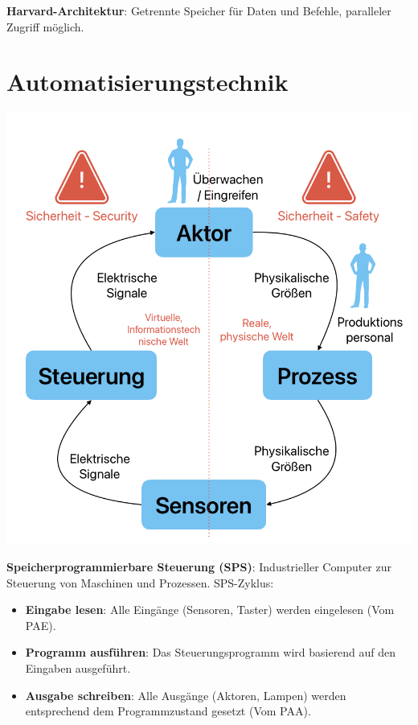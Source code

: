 \documentclass[10pt, a3paper, landscape]{article}
\newcommand{\algo}[1]{\textbf{\textcolor{blue!60!black}{#1}}}
\newcommand{\datastruct}[1]{\textbf{\textcolor{red!60!black}{#1}}}
\begin{document}
\begin{multicols*}{4}
\begin{itemize}
\textbf{Harvard-Architektur}: Getrennte Speicher für Daten und Befehle, paralleler Zugriff möglich.


\section{Automatisierungstechnik}
  
\begin{center}
    \includegraphics[width=0.8\linewidth]{assets/ATC.png}
\end{center}

\datastruct{Speicherprogrammierbare Steuerung (SPS)}: Industrieller Computer zur Steuerung von Maschinen und Prozessen. SPS-Zyklus:
\begin{itemize}
    \item \algo{Eingabe lesen}: Alle Eingänge (Sensoren, Taster) werden eingelesen (Vom PAE).
    \item \algo{Programm ausführen}: Das Steuerungsprogramm wird basierend auf den Eingaben ausgeführt.
    \item \algo{Ausgabe schreiben}: Alle Ausgänge (Aktoren, Lampen) werden entsprechend dem Programmzustand gesetzt (Vom PAA).
\end{itemize}


\end{itemize}
\end{multicols*}
\end{document}
